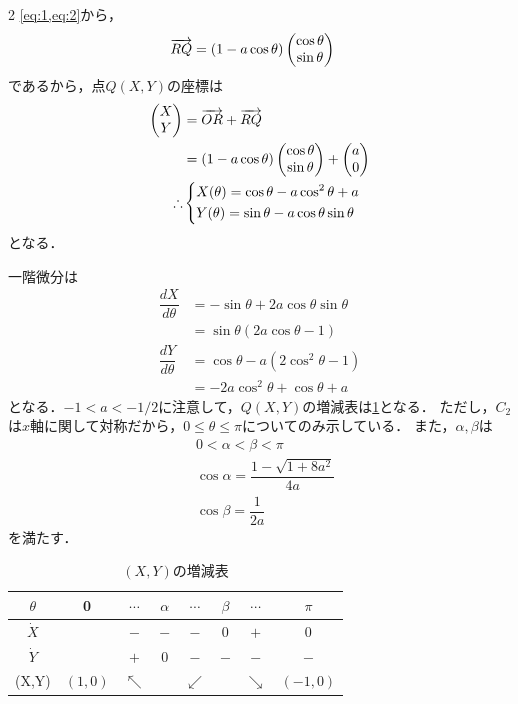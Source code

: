 \documentclass[../../main.tex]{subfiles}
\begin{document}
\begin{multicols}{2}
  \cref{eq:1,eq:2}から，
  \begin{align}
    \overrightarrow{RQ}
    & = \left(1-a\cos\theta\right) \mqty(\cos\theta \\ \sin\theta)
  \end{align}
  であるから，点$Q(X,Y)$の座標は
  \begin{align}
    \mqty( X                                          \\ Y )
    & = \overrightarrow{OR} + \overrightarrow{RQ}                          \\
    & = \left(1-a\cos\theta\right) \mqty(\cos\theta \\ \sin\theta) + \mqty(a \\ 0) \\
    \therefore
    &
    \begin{dcases}
      X(\theta) = \cos\theta-a\cos^2\theta +a \\
      Y(\theta) = \sin\theta-a\cos\theta\sin\theta
    \end{dcases} \label{eq:3}
  \end{align}
  となる．

  一階微分は
  \begin{align}
    \dfrac{dX}{d\theta}
    & = -\sin\theta+2a\cos\theta\sin\theta       \\
    & = \sin\theta\left(2a\cos\theta-1\right)    \\
    \dfrac{dY}{d\theta}
    & = \cos\theta-a\left(2\cos^2\theta-1\right) \\
    & = -2a\cos^2\theta+\cos\theta+a
  \end{align}
  となる．$-1<a<-1/2$に注意して，$Q(X,Y)$の増減表は\cref{2001-6:table:1}となる．
  ただし，$C_2$は$x$軸に関して対称だから，$0\le \theta \le \pi$についてのみ示している．
  また，$\alpha,\beta$は
  \begin{align}
    & 0 < \alpha < \beta < \pi                \\
    & \cos\alpha = \dfrac{1-\sqrt{1+8a^2}}{4a} \\
    & \cos\beta = \dfrac{1}{2a}
  \end{align}
  を満たす．

  \begin{table}[H]
    \centering
    \caption{$(X,Y)$の増減表}
    \label{2001-6:table:1}
    \begin{tabular}{|c||c|c|c|c|c|c|c|}
      \hline
      $\theta$  & 0       & $\cdots$   & $\alpha$ & $\cdots$   & $\beta$ & $\cdots$   & $\pi$    \\
      \hline
      $\dot{X}$ &         & $-$        & $-$      & $-$        & 0       & $+$        & $0$      \\
      \hline
      $\dot{Y}$ &         & $+$        & 0        & $-$        & $-$     & $-$        & $-$      \\
      \hline
      (X,Y)     & $(1,0)$ & $\nwarrow$ &          & $\swarrow$ &         & $\searrow$ & $(-1,0)$ \\
      \hline
    \end{tabular}
  \end{table}


\end{multicols}
\end{document}
